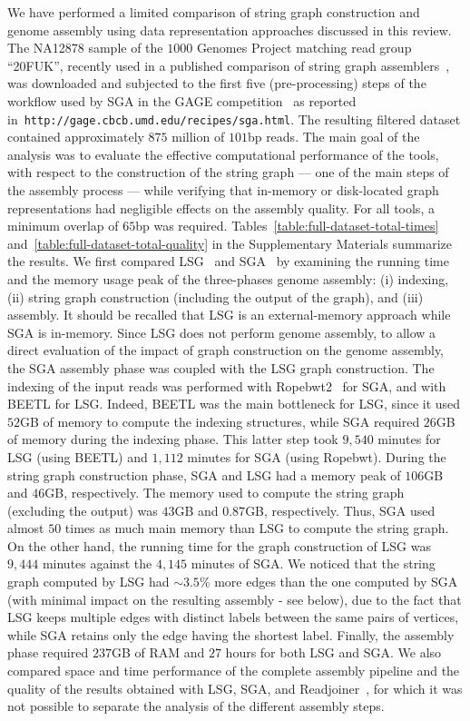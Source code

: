 \documentclass[11pt,oneside,a4paper]{article}
\begin{document}
We have performed a limited comparison of string graph construction and genome
assembly using data representation approaches discussed in this review.
%
The NA12878 sample of the $1000$ Genomes Project matching read group
``20FUK'', recently used in a published comparison of string graph
assemblers~\cite{Bonizzoni2015}, was downloaded and subjected to the
first five (pre-processing) steps of the workflow used by SGA in the
GAGE competition~\cite{salzberg2012gage} as reported
in~\texttt{http://gage.cbcb.umd.edu/recipes/sga.html}.
%
The resulting filtered dataset contained approximately $875$ million
of $101$bp reads.
%
The main goal of the analysis was to evaluate the effective computational performance of the tools, with respect to the construction of
the string graph --- one of the main steps of the assembly
process --- while verifying that in-memory or disk-located graph
representations had negligible effects on the assembly quality.
%
For all tools, a minimum overlap of $65$bp was required.
%
Tables~\ref{table:full-dataset-total-times}
and~\ref{table:full-dataset-total-quality} in the Supplementary Materials
summarize the results.
%
We first compared LSG~\cite{Bonizzoni2015} and
SGA~\cite{Simpson2010,Simpson2012} by examining the running time and
the memory usage peak of the three-phases genome assembly: (i) indexing,
(ii) string graph construction (including the output of the graph), and
(iii) assembly.
%
It should be recalled that LSG is an external-memory approach while SGA
is in-memory.
%
Since LSG does not perform genome assembly, to allow a direct evaluation
of the impact of graph construction on the genome assembly, the SGA assembly
phase was coupled with the LSG graph construction.
%
The indexing of the input reads was performed with Ropebwt2~\cite{Li15112014}
for SGA, and with BEETL for LSG.
%
Indeed, BEETL was the main bottleneck for LSG, since it used $52$GB of
memory to compute the indexing structures, while SGA required $26$GB of
memory during the indexing phase.
%
This latter step took $9,540$ minutes  for LSG (using BEETL)
and $1,112$ minutes for SGA (using Ropebwt).
%
During the string graph construction phase, SGA and LSG had a memory peak
of $106$GB and $46$GB, respectively.
%
The memory used to compute the string graph (excluding the output) was
$43$GB and $0.87$GB, respectively.
%
Thus, SGA used almost $50$ times as much main memory than LSG to compute the string graph.
%
On the other hand, the running time for the graph construction of LSG was
$9,444$ minutes against the $4,145$ minutes of SGA.
%
We noticed that the string graph computed by LSG had $\sim 3.5$\% more
edges than the one computed by SGA (with minimal impact on the resulting
assembly - see below), due to the fact that LSG keeps multiple edges with
distinct labels between the same pairs of vertices, while SGA retains only
the edge having the shortest label.
%
Finally, the assembly phase required $237$GB of RAM and $27$ hours for both
LSG and SGA.
%
We also compared space and time performance of the complete assembly
pipeline and the quality of the results obtained with LSG, SGA, and
Readjoiner~\cite{readjoiner}, for which it was not possible to separate the analysis of the different assembly steps.
\end{document}
